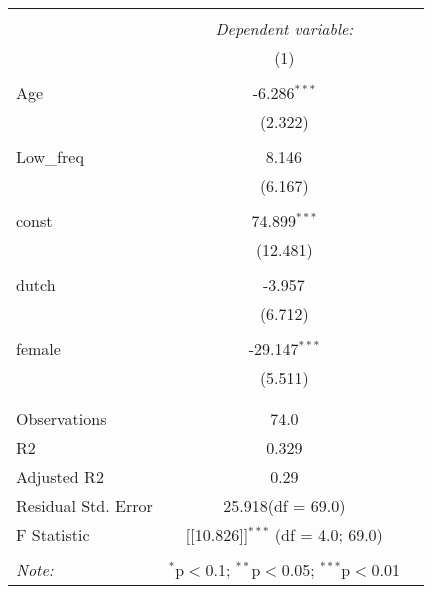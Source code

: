 \documentclass{report}
\begin{document}
\begin{table}[!htbp] \centering
  \label{}
\begin{tabular}{@{\extracolsep{5pt}}lcc}
\\[-1.8ex]\hline
\hline \\[-1.8ex]
& \multicolumn{1}{c}{\textit{Dependent variable:}} \
\cr \cline{1-2}
\\[-1.8ex] & (1) \\
\hline \\[-1.8ex]
 Age & -6.286$^{***}$ \\
  & (2.322) \\
  & \\
 Low_freq & 8.146$^{}$ \\
  & (6.167) \\
  & \\
 const & 74.899$^{***}$ \\
  & (12.481) \\
  & \\
 dutch & -3.957$^{}$ \\
  & (6.712) \\
  & \\
 female & -29.147$^{***}$ \\
  & (5.511) \\
  & \\
\hline \\[-1.8ex]
 Observations & 74.0 \\
 R${2}$ & 0.329 \\
 Adjusted R${2}$ & 0.29 \\
 Residual Std. Error & 25.918(df = 69.0)  \\
 F Statistic & [[10.826]]$^{***}$ (df = 4.0; 69.0) \\
\hline
\hline \\[-1.8ex]
\textit{Note:} & \multicolumn{1}{r}{$^{*}$p$<$0.1; $^{**}$p$<$0.05; $^{***}$p$<$0.01} \\
\end{tabular}
\end{table}
\end{document}
